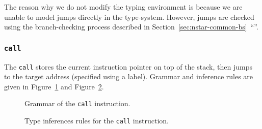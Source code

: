 The reason why we do not modify the typing environment is because we are unable to model jumps directly in the type-system.
However, jumps are checked using the branch-checking process described in Section~\ref{sec:nstar-common-bs}~``''.

\subsubsection{\texttt{call}}\label{subsubsec:nstar-specific-x86amd64-instructions-call}

The \texttt{call} stores the current instruction pointer on top of the stack, then jumps to the target address (specified using a label).
Grammar and inference rules are given in Figure~\ref{fig:nstar-specific-x86amd64-instructions-call-grammar} and Figure~\ref{fig:nstar-specific-x86amd64-instructions-call-typerules}.

\begin{figure}[H]
  \centering


  \caption{Grammar of the \texttt{call} instruction.}
  \label{fig:nstar-specific-x86amd64-instructions-call-grammar}
\end{figure}

\begin{figure}[H]
  \centering

  \begin{prooftree}
  \end{prooftree}

  \caption{Type inferences rules for the \texttt{call} instruction.}
  \label{fig:nstar-specific-x86amd64-instructions-call-typerules}
\end{figure}
